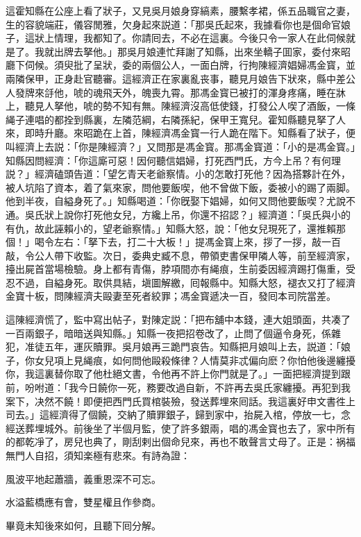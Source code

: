 這霍知縣在公座上看了狀子，又見吳月娘身穿縞素，腰繫孝裙，係五品職官之妻，生的容貌端莊，儀容閒雅，欠身起來説道：「那吳氏起來，我據看你也是個命官娘子，這狀上情理，我都知了。你請囘去，不必在這裏。今後只令一家人在此伺候就是了。我就出牌去拏他。」那吳月娘連忙拜謝了知縣，出來坐轎子囬家，委付來昭廳下伺候。須臾批了呈狀，委的兩個公人，一面白牌，行拘陳經濟娼婦馮金寳，並兩隣保甲，正身赴官聽審。這經濟正在家裏亂丧事，聽見月娘告下狀來，縣中差公人發牌來㧱他，唬的魂飛天外，魄喪九霄。那馮金寳已被打的渾身疼痛，睡在牀上，聽見人拏他，唬的勢不知有無。陳經濟沒高低使錢，打發公人喫了酒飯，一條䋲子連唱的都拴到縣裏，左隣范綱，右隣孫紀，保甲王寬兒。霍知縣聽見拏了人來，即時升廳。來昭跪在上首，陳經濟馮金寳一行人跪在階下。知縣看了狀子，便叫經濟上去説：「你是陳經濟？」又問那是馮金寳。那馮金寳道：「小的是馮金寳。」知縣因問經濟：「你這廝可惡！因何聽信娼婦，打死西門氏，方今上吊？有何理説？」經濟磕頭告道：「望乞青天老爺察情。小的怎敢打死他？因為搭夥計在外，被人坑陷了資本，着了氣來家，問他要飯喫，他不曾做下飯，委被小的踢了兩脚。他到半夜，自縊身死了。」知縣喝道：「你旣娶下娼婦，如何又問他要飯喫？尤說不通。吳氏狀上說你打死他女兒，方纔上吊，你還不招認？」經濟道：「吳氏與小的有仇，故此誣賴小的，望老爺察情。」知縣大怒，說：「他女兒現死了，還推賴那個！」喝令左右：「拏下去，打二十大板！」提馮金寳上來，拶了一拶，敲一百敲，令公人帶下收監。次日，委典史臧不息，帶領吏書保甲隣人等，前至經濟家，擡出屍首當場檢驗。身上都有青傷，脖項間亦有䋲痕，生前委因經濟踢打傷重，受忍不過，自縊身死。取供具結，塡圖解繳，囘報縣中。知縣大怒，褪衣又打了經濟金寶十板，問陳經濟夫毆妻至死者絞罪；馮金寳遞决一百，發囘本司院當差。

這陳經濟慌了，監中寫出帖子，對陳定説：「把布舖中本錢，連大姐頭面，共凑了一百兩銀子，暗暗送與知縣。」知縣一夜把招卷改了，止問了個逼令身死，係雜犯，准徒五年，運灰贖罪。吳月娘再三跪門哀告。知縣把月娘叫上去，説道：「娘子，你女兒項上見䋲痕，如何問他毆殺條律？人情莫非忒偏向麽？你怕他後邊纏擾你，我這裏替你取了他杜絕文書，令他再不許上你門就是了。」一面把經濟提到跟前，吩咐道：「我今日饒你一死，務要改過自新，不許再去吳氏家纏擾。再犯到我案下，决然不饒！即便把西門氏買棺裝殮，發送葬埋來囘話。我這裏好申文書徃上司去。」這經濟得了個饒，交納了贖罪銀子，歸到家中，抬屍入棺，停放一七，念經送葬埋城外。前後坐了半個月監，使了許多銀兩，唱的馮金寳也去了，家中所有的都乾凈了，房兒也典了，剛刮剌出個命兒來，再也不敢聲言丈母了。正是：祸福無門人自招，須知楽極有悲來。有詩為證：

\begin{myquote}
風波平地起蕭牆，義重恩深不可忘。

水溢藍橋應有會，雙星權且作參商。
\end{myquote}

畢竟未知後來如何，且聽下囘分解。

